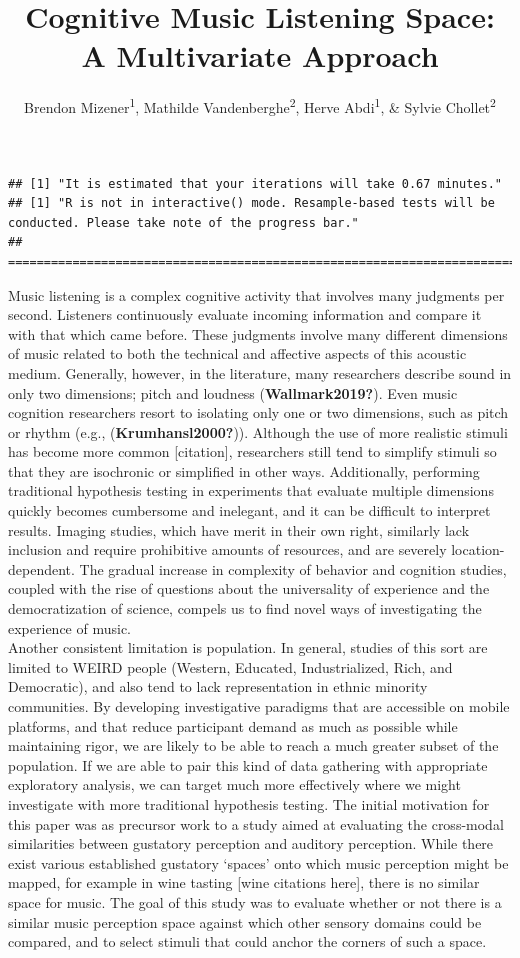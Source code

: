 \documentclass[
  english,
  man]{apa6}
\title{Cognitive Music Listening Space: A Multivariate Approach}
\author{Brendon Mizener\textsuperscript{1}, Mathilde Vandenberghe\textsuperscript{2}, Herve Abdi\textsuperscript{1}, \& Sylvie Chollet\textsuperscript{2}}
\date{}
\affiliation{\vspace{0.5cm}\textsuperscript{1} University of Texas at Dallas\\\textsuperscript{2} YNCREA}
\begin{document}
\maketitle

\begin{verbatim}
## [1] "It is estimated that your iterations will take 0.67 minutes."
## [1] "R is not in interactive() mode. Resample-based tests will be conducted. Please take note of the progress bar."
## ================================================================================
\end{verbatim}

Music listening is a complex cognitive activity that involves many judgments per second. Listeners continuously evaluate incoming information and compare it with that which came before. These judgments involve many different dimensions of music related to both the technical and affective aspects of this acoustic medium. Generally, however, in the literature, many researchers describe sound in only two dimensions; pitch and loudness (\textbf{Wallmark2019?}). Even music cognition researchers resort to isolating only one or two dimensions, such as pitch or rhythm (e.g., (\textbf{Krumhansl2000?})). Although the use of more realistic stimuli has become more common {[}citation{]}, researchers still tend to simplify stimuli so that they are isochronic or simplified in other ways. Additionally, performing traditional hypothesis testing in experiments that evaluate multiple dimensions quickly becomes cumbersome and inelegant, and it can be difficult to interpret results. Imaging studies, which have merit in their own right, similarly lack inclusion and require prohibitive amounts of resources, and are severely location-dependent. The gradual increase in complexity of behavior and cognition studies, coupled with the rise of questions about the universality of experience and the democratization of science, compels us to find novel ways of investigating the experience of music.\\
Another consistent limitation is population. In general, studies of this sort are limited to WEIRD people (Western, Educated, Industrialized, Rich, and Democratic), and also tend to lack representation in ethnic minority communities. By developing investigative paradigms that are accessible on mobile platforms, and that reduce participant demand as much as possible while maintaining rigor, we are likely to be able to reach a much greater subset of the population. If we are able to pair this kind of data gathering with appropriate exploratory analysis, we can target much more effectively where we might investigate with more traditional hypothesis testing.
The initial motivation for this paper was as precursor work to a study aimed at evaluating the cross-modal similarities between gustatory perception and auditory perception. While there exist various established gustatory `spaces' onto which music perception might be mapped, for example in wine tasting {[}wine citations here{]}, there is no similar space for music. The goal of this study was to evaluate whether or not there is a similar music perception space against which other sensory domains could be compared, and to select stimuli that could anchor the corners of such a space.
\end{document}
